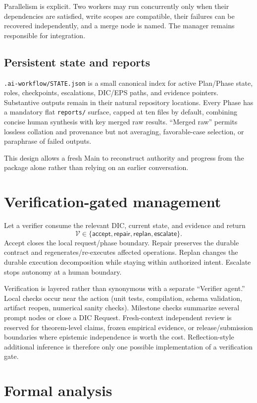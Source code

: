 \documentclass{article}
\begin{document}
Parallelism is explicit. Two workers may run concurrently only when their dependencies are satisfied, write scopes are compatible, their failures can be recovered independently, and a merge node is named. The manager remains responsible for integration.

\subsection{Persistent state and reports}
\texttt{.ai-workflow/STATE.json} is a small canonical index for active Plan/Phase state, roles, checkpoints, escalations, DIC/EPS paths, and evidence pointers. Substantive outputs remain in their natural repository locations. Every Phase has a mandatory flat \texttt{reports/} surface, capped at ten files by default, combining concise human synthesis with key merged raw results. ``Merged raw'' permits lossless collation and provenance but not averaging, favorable-case selection, or paraphrase of failed outputs.

This design allows a fresh Main to reconstruct authority and progress from the package alone rather than relying on an earlier conversation.

\section{Verification-gated management}
Let a verifier consume the relevant DIC, current state, and evidence and return
\[
\mathcal V\in\{\mathsf{accept},\mathsf{repair},\mathsf{replan},\mathsf{escalate}\}.
\]
\textsf{Accept} closes the local request/phase boundary. \textsf{Repair} preserves the durable contract and regenerates/re-executes affected operations. \textsf{Replan} changes the durable execution decomposition while staying within authorized intent. \textsf{Escalate} stops autonomy at a human boundary.

Verification is layered rather than synonymous with a separate ``Verifier agent.'' Local checks occur near the action (unit tests, compilation, schema validation, artifact reopen, numerical sanity checks). Milestone checks summarize several prompt nodes or close a DIC Request. Fresh-context independent review is reserved for theorem-level claims, frozen empirical evidence, or release/submission boundaries where epistemic independence is worth the cost. Reflection-style additional inference \citep{shinn2023reflexion} is therefore only one possible implementation of a verification gate.

\section{Formal analysis}
\end{document}
